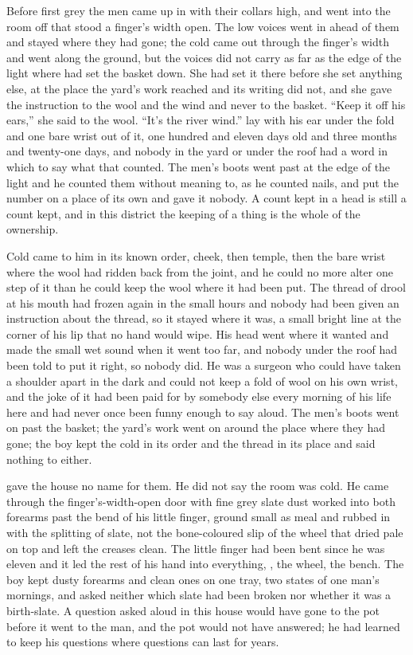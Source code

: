 
Before first grey the men came up  in  with their collars high, and went into the room off  that stood a finger's width open. The low voices went in ahead of them and stayed where they had gone; the cold came out through the finger's width and went along the ground, but the voices did not carry as far as the edge of the light where  had set the basket down. She had set it there before she set anything else, at the place the yard's work reached and its writing did not, and she gave the instruction to the wool and the wind and never to the basket. “Keep it off his ears,” she said to the wool. “It's the river wind.”  lay with his ear under the fold and one bare wrist out of it, one hundred and eleven days old and three months and twenty-one days, and nobody in the yard or under the roof had a word in which to say what that counted. The men's boots went past at the edge of the light and he counted them without meaning to, as he counted nails, and put the number on a place of its own and gave it nobody. A count kept in a head is still a count kept, and in this district the keeping of a thing is the whole of the ownership.

Cold came to him in its known order, cheek, then temple, then the bare wrist where the wool had ridden back from the joint, and he could no more alter one step of it than he could keep the wool where it had been put. The thread of drool at his mouth had frozen again in the small hours and nobody had been given an instruction about the thread, so it stayed where it was, a small bright line at the corner of his lip that no hand would wipe. His head went where it wanted and made the small wet sound when it went too far, and nobody under the roof had been told to put it right, so nobody did. He was a surgeon who could have taken a shoulder apart in the dark and could not keep a fold of wool on his own wrist, and the joke of it had been paid for by somebody else every morning of his life here and had never once been funny enough to say aloud. The men's boots went on past the basket; the yard's work went on around the place where they had gone; the boy kept the cold in its order and the thread in its place and said nothing to either.

 gave the house no name for them. He did not say the room was cold. He came through the finger's-width-open door with fine grey slate dust worked into both forearms past the bend of his little finger, ground small as meal and rubbed in with the splitting of slate, not the bone-coloured slip of the wheel that dried pale on top and left the creases clean. The little finger had been bent since he was eleven and it led the rest of his hand into everything, , the wheel, the bench. The boy kept dusty forearms and clean ones on one tray, two states of one man's mornings, and asked neither which slate had been broken nor whether it was a birth-slate. A question asked aloud in this house would have gone to the pot before it went to the man, and the pot would not have answered; he had learned to keep his questions where questions can last for years.

